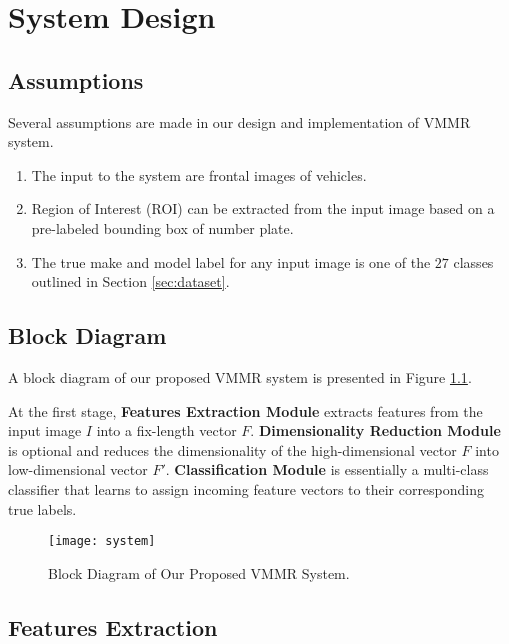 \chapter{System Design}
\label{chap:design}

\section{Assumptions}

Several assumptions are made in our design and implementation of VMMR system.

\begin{enumerate}
\item
	The input to the system are frontal images of vehicles.
\item
	Region of Interest (ROI) can be extracted from the input image based on a pre-labeled bounding box of number plate.
\item
	The true make and model label for any input image is one of the $27$ classes outlined in Section \ref{sec:dataset}.
\end{enumerate}


\section{Block Diagram}

A block diagram of our proposed VMMR system is presented in Figure \ref{fig:system}.

At the first stage, \textbf{Features Extraction Module} extracts features from the input image $I$ into a fix-length vector $F$. 
\textbf{Dimensionality Reduction Module} is optional and reduces the dimensionality of the high-dimensional vector $F$ into low-dimensional vector $F'$.
\textbf{Classification Module} is essentially a multi-class classifier that learns to assign incoming feature vectors to their corresponding true labels.


\begin{figure}
\centering
\texttt{[image: system]}
\caption{Block Diagram of Our Proposed VMMR System.}
\label{fig:system}
\end{figure}

\section{Features Extraction}

